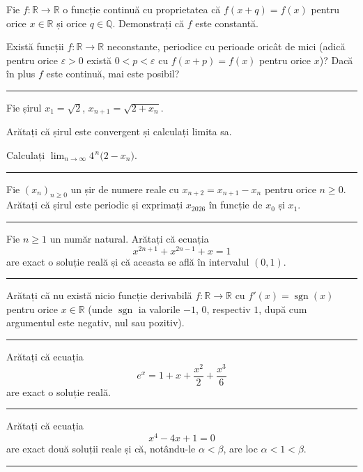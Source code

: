 \begin{parti}
  \item Fie $f:\mathbb{R}\to\mathbb{R}$ o funcție continuă cu proprietatea că $f(x+q)=f(x)$ pentru orice $x\in\mathbb{R}$ și orice $q\in\mathbb{Q}$. Demonstrați că $f$ este constantă.
  \item Există funcții $f:\mathbb{R}\to\mathbb{R}$ neconstante, periodice cu perioade oricât de mici (adică pentru orice $\varepsilon>0$ există $0<p<\varepsilon$ cu $f(x+p)=f(x)$ pentru orice $x$)? Dacă în plus $f$ este continuă, mai este posibil?
\end{parti}
\vspace{1mm}\hrule

Fie șirul $x_1=\sqrt{2}$, $x_{n+1}=\sqrt{2+x_n}$.
\begin{parti}
  \item Arătați că șirul este convergent și calculați limita sa.
  \item Calculați $\displaystyle\lim_{n\to\infty}4^{\,n}\bigl(2-x_n\bigr)$.
\end{parti}
\vspace{1mm}\hrule

Fie $(x_n)_{n\ge0}$ un șir de numere reale cu $x_{n+2}=x_{n+1}-x_n$ pentru orice $n\ge0$. Arătați că șirul este periodic și exprimați $x_{2026}$ în funcție de $x_0$ și $x_1$.
\vspace{1mm}\hrule

Fie $n\ge1$ un număr natural. Arătați că ecuația
\[ x^{2n+1}+x^{2n-1}+x=1 \]
are exact o soluție reală și că aceasta se află în intervalul $(0,1)$.
\vspace{1mm}\hrule

Arătați că nu există nicio funcție derivabilă $f:\mathbb{R}\to\mathbb{R}$ cu $f'(x)=\operatorname{sgn}(x)$ pentru orice $x\in\mathbb{R}$ (unde $\operatorname{sgn}$ ia valorile $-1$, $0$, respectiv $1$, după cum argumentul este negativ, nul sau pozitiv).
\vspace{1mm}\hrule

Arătați că ecuația
\[ e^x=1+x+\frac{x^2}{2}+\frac{x^3}{6} \]
are exact o soluție reală.
\vspace{1mm}\hrule

Arătați că ecuația
\[ x^{4}-4x+1=0 \]
are exact două soluții reale și că, notându-le $\alpha<\beta$, are loc $\alpha<1<\beta$.
\vspace{1mm}\hrule

